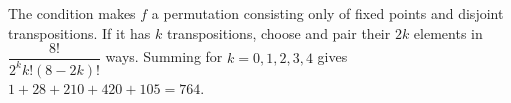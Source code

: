 The condition makes $f$ a permutation consisting only of fixed points and disjoint transpositions. If it has $k$ transpositions, choose and pair their $2k$ elements in $\dfrac{8!}{2^k k!(8-2k)!}$ ways. Summing for $k=0,1,2,3,4$ gives $1+28+210+420+105=\boxed{764}$.
